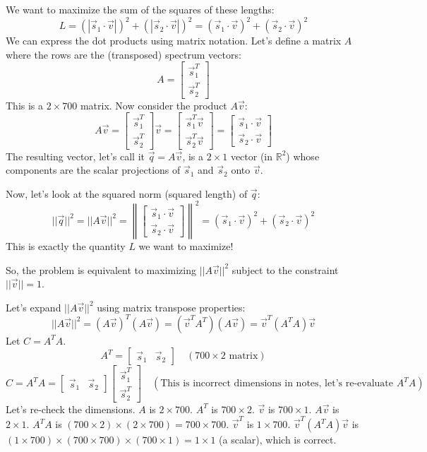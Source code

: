 \documentclass{report}
\begin{document}
We want to maximize the sum of the squares of these lengths:
\[
	L = (|\vec{s}_1 \cdot \vec{v}|)^2 + (|\vec{s}_2 \cdot \vec{v}|)^2 = (\vec{s}_1 \cdot \vec{v})^2 + (\vec{s}_2 \cdot \vec{v})^2
\]
We can express the dot products using matrix notation. Let's define a matrix $A$ where the rows are the (transposed) spectrum vectors:
\[
	A = \begin{bmatrix} \vec{s}_1^T \\ \vec{s}_2^T \end{bmatrix}
\]
This is a $2 \times 700$ matrix. Now consider the product $A\vec{v}$:
\[
	A\vec{v} = \begin{bmatrix} \vec{s}_1^T \\ \vec{s}_2^T \end{bmatrix} \vec{v} = \begin{bmatrix} \vec{s}_1^T \vec{v} \\ \vec{s}_2^T \vec{v} \end{bmatrix} = \begin{bmatrix} \vec{s}_1 \cdot \vec{v} \\ \vec{s}_2 \cdot \vec{v} \end{bmatrix}
\]
The resulting vector, let's call it $\vec{q} = A\vec{v}$, is a $2 \times 1$ vector (in $\mathbb{R}^2$) whose components are the scalar projections of $\vec{s}_1$ and $\vec{s}_2$ onto $\vec{v}$.

Now, let's look at the squared norm (squared length) of $\vec{q}$:
\[
	||\vec{q}||^2 = ||A\vec{v}||^2 = \left\| \begin{bmatrix} \vec{s}_1 \cdot \vec{v} \\ \vec{s}_2 \cdot \vec{v} \end{bmatrix} \right\|^2 = (\vec{s}_1 \cdot \vec{v})^2 + (\vec{s}_2 \cdot \vec{v})^2
\]
This is exactly the quantity $L$ we want to maximize!

So, the problem is equivalent to maximizing $||A\vec{v}||^2$ subject to the constraint $||\vec{v}||=1$.

Let's expand $||A\vec{v}||^2$ using matrix transpose properties:
\[
	||A\vec{v}||^2 = (A\vec{v})^T (A\vec{v}) = (\vec{v}^T A^T) (A\vec{v}) = \vec{v}^T (A^T A) \vec{v}
\]
Let $C = A^T A$.
\[
	A^T = \begin{bmatrix} \vec{s}_1 & \vec{s}_2 \end{bmatrix} \quad (700 \times 2 \text{ matrix})
\]
\[
	C = A^T A = \begin{bmatrix} \vec{s}_1 & \vec{s}_2 \end{bmatrix} \begin{bmatrix} \vec{s}_1^T \\ \vec{s}_2^T \end{bmatrix} \quad (\text{This is incorrect dimensions in notes, let's re-evaluate } A^TA)
\]
Let's re-check the dimensions.
$A$ is $2 \times 700$.
$A^T$ is $700 \times 2$.
$\vec{v}$ is $700 \times 1$.
$A\vec{v}$ is $2 \times 1$.
$A^T A$ is $(700 \times 2) \times (2 \times 700) = 700 \times 700$.
$\vec{v}^T$ is $1 \times 700$.
$\vec{v}^T (A^T A) \vec{v}$ is $(1 \times 700) \times (700 \times 700) \times (700 \times 1) = 1 \times 1$ (a scalar), which is correct.
\end{document}
